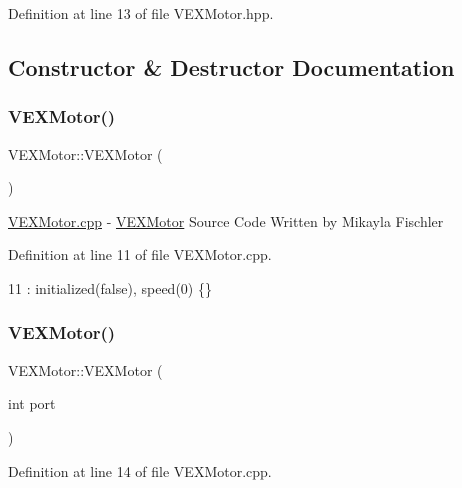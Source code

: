 Definition at line 13 of file V\+E\+X\+Motor.\+hpp.



\subsection{Constructor \& Destructor Documentation}
\mbox{\label{class_v_e_x_motor_ad8962ee0dee1654ed846df974c36e848}} 
\subsubsection{\texorpdfstring{V\+E\+X\+Motor()}{VEXMotor()}\hspace{0.1cm}{\footnotesize\ttfamily [1/3]}}
{\footnotesize\ttfamily V\+E\+X\+Motor\+::\+V\+E\+X\+Motor (\begin{DoxyParamCaption}{ }\end{DoxyParamCaption})}

\hyperlink{_v_e_x_motor_8cpp}{V\+E\+X\+Motor.\+cpp} -\/ \hyperlink{class_v_e_x_motor}{V\+E\+X\+Motor} Source Code Written by Mikayla Fischler 

Definition at line 11 of file V\+E\+X\+Motor.\+cpp.


\begin{DoxyCode}
11 : initialized(\textcolor{keyword}{false}), speed(0) \{\}
\end{DoxyCode}
\mbox{\label{class_v_e_x_motor_a580907c6cae0d4f8c525c5ce5916c9f8}} 
\subsubsection{\texorpdfstring{V\+E\+X\+Motor()}{VEXMotor()}\hspace{0.1cm}{\footnotesize\ttfamily [2/3]}}
{\footnotesize\ttfamily V\+E\+X\+Motor\+::\+V\+E\+X\+Motor (\begin{DoxyParamCaption}\item[{int}]{port }\end{DoxyParamCaption})}



Definition at line 14 of file V\+E\+X\+Motor.\+cpp.


